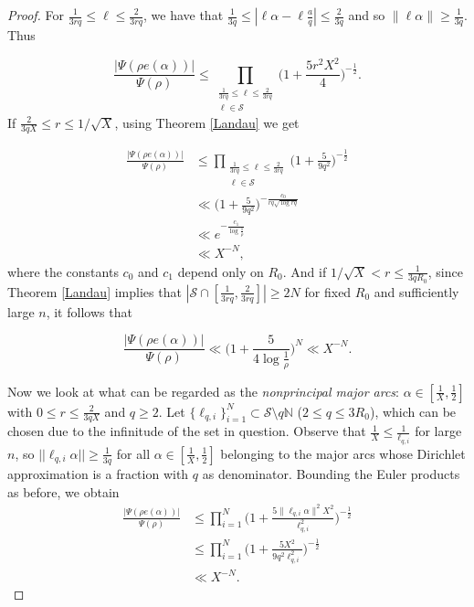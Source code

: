 \documentclass[12pt,reqno]{amsart}
\begin{document}
\begin{proof}
For $\frac{1}{3rq}\leq \ell \leq \frac{2}{3rq}$, we have that $\frac{1}{3q}\leq |\ell\alpha - \ell\frac{a}{q}| \leq \frac{2}{3q}$ and so $\|\ell\alpha\|\geq \frac{1}{3q}$. Thus

\begin{equation*}
    \frac{|\Psi(\rho e(\alpha))|}{\Psi(\rho)} \leq \prod_{\substack{\frac{1}{3rq}\leq \ell \leq \frac{2}{3rq}\\ \ell \in \mathcal{S}}} \Bigg(1+\frac{5r^2X^2}{4}\Bigg)^{-\frac{1}{2}}.
\end{equation*}
 If $\frac{2}{3qX}\leq r \leq 1/\sqrt{X}$, using Theorem \ref{Landau} we get 

\begin{align*}
     \frac{|\Psi(\rho e(\alpha))|}{\Psi(\rho)} & \leq \prod_{\substack{\frac{1}{3rq}\leq \ell \leq \frac{2}{3rq}\\ \ell \in \mathcal{S}}} \Bigg(1+\frac{5}{ 9q^2}\Bigg)^{-\frac{1}{2}}  \\\
      & \ll  \Bigg(1+\frac{5}{ 9q^2}\Bigg)^{-\frac{c_0}{rq\sqrt{\log rq}}}  \\
      & \ll e^{-\frac{c_1}{\log \frac{1}{\rho}}}\\
       & \ll X^{-N},
\end{align*}
where the constants $c_0$ and $c_1$ depend only on $R_0$. And if $1/\sqrt{X}< r \leq \frac{1}{3qR_0}$, since  Theorem \ref{Landau} implies that $|\mathcal{S}\cap[\frac{1}{3rq},\frac{2}{3rq}]|\geq 2N$ for fixed $R_0$ and sufficiently large $n$, it follows that

\begin{equation*}
    \frac{|\Psi(\rho e(\alpha))|}{\Psi(\rho)} \ll\Bigg(1+\frac{5}{ 4 \log \frac{1}{\rho}}\Bigg)^{N}  \ll X^{-N}.
\end{equation*}


Now we look at what can be regarded as the \textit{nonprincipal major arcs}: $\alpha \in [\frac{1}{X}, \frac{1}{2}]$ with $0\leq r \leq \frac{2}{3qX}$ and $q\geq 2$. %
Let $\{\ell_{q,i}\}_{i=1}^N \subset \mathcal{S}\setminus q\mathbb{N}$ ($2\leq q \leq 3R_0$), which can be chosen due to the infinitude of the set in question. Observe that $\frac{1}{X}\leq \frac{1}{\ell_{q,i}}$ for large $n$, %
so $||\ell_{q,i}\alpha ||\geq \frac{1}{3q}$ for all $\alpha \in [\frac{1}{X}, \frac{1}{2}]$ belonging to the major arcs whose Dirichlet approximation is a fraction with $q$ as denominator. Bounding the Euler products as before, we obtain
\begin{align*}
    \frac{|\Psi(\rho e(\alpha))|}{\Psi(\rho)}  & \leq \prod_{i=1}^N \Bigg(1+\frac{5\|\ell_{q,i}\alpha\|^2X^2}{\ell_{q,i}^2}\Bigg)^{-\frac{1}{2}}\\
    & \leq \prod_{i=1}^N \Bigg(1+\frac{5X^2}{9q^2\ell_{q,i}^2}\Bigg)^{-\frac{1}{2}}\\
    & \ll X^{-N}.
\end{align*}


\end{proof}
\end{document}
